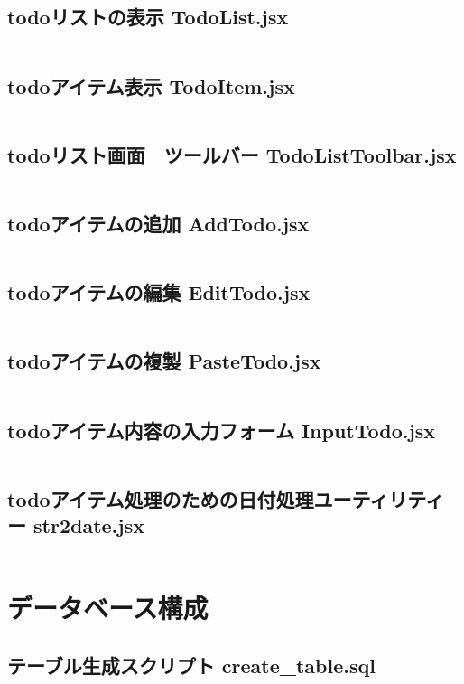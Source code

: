 \documentclass[paper=a4paper, fontsize=10pt, head_space=10mm, foot_space=17mm, gutter=17mm, line_length=185mm, twoside]{jlreq}
\begin{document}
\subsection {todoリストの表示 TodoList.jsx}
\inputminted[linenos, breaklines]{jsx}{src-react/TodoList.jsx}
\clearpage

\subsection {todoアイテム表示 TodoItem.jsx}
\inputminted[linenos, breaklines]{jsx}{src-react/TodoItem.jsx}
\clearpage

\subsection {todoリスト画面　ツールバー TodoListToolbar.jsx} 
\inputminted[linenos, breaklines]{jsx}{src-react/TodoListToolbar.jsx}
\clearpage

\subsection {todoアイテムの追加 AddTodo.jsx}
\inputminted[linenos, breaklines]{jsx}{src-react/AddTodo.jsx}
\clearpage

\subsection {todoアイテムの編集 EditTodo.jsx}
\inputminted[linenos, breaklines]{jsx}{src-react/EditTodo.jsx}
\clearpage

\subsection {todoアイテムの複製 PasteTodo.jsx}
\inputminted[linenos, breaklines]{jsx}{src-react/PasteTodo.jsx}
\clearpage

\subsection {todoアイテム内容の入力フォーム InputTodo.jsx}
\inputminted[linenos, breaklines]{jsx}{src-react/InputTodo.jsx}
\clearpage

\subsection {todoアイテム処理のための日付処理ユーティリティー str2date.jsx}
\inputminted[linenos, breaklines]{jsx}{src-react/str2date.jsx}
\clearpage

\section{データベース構成}
\subsection{テーブル生成スクリプト create\_table.sql}
\inputminted[linenos, breaklines]{sql}{mariadb/create_table.sql}
\clearpage
\end{document}
